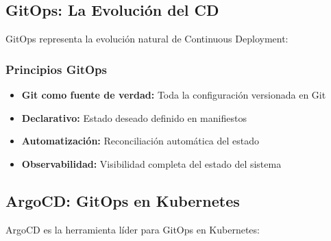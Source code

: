 \documentclass[12pt,a4paper]{article}
\begin{document}
\subsection{GitOps: La Evolución del CD}
GitOps representa la evolución natural de Continuous Deployment:

\subsubsection{Principios GitOps}
\begin{itemize}
    \item \textbf{Git como fuente de verdad:} Toda la configuración versionada en Git
    \item \textbf{Declarativo:} Estado deseado definido en manifiestos
    \item \textbf{Automatización:} Reconciliación automática del estado
    \item \textbf{Observabilidad:} Visibilidad completa del estado del sistema
\end{itemize}

\subsection{ArgoCD: GitOps en Kubernetes}
ArgoCD es la herramienta líder para GitOps en Kubernetes:
\end{document}
